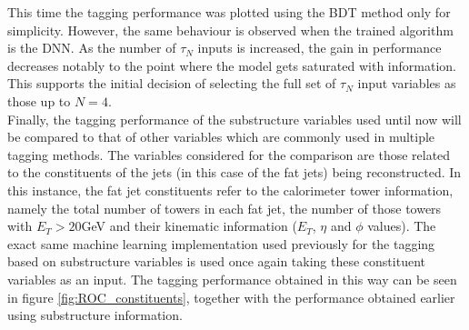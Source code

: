\documentclass[main]{subfiles} %
\begin{document}
This time the tagging performance was plotted using the BDT method only for simplicity. However, the same behaviour is observed when the trained algorithm is the DNN. As the number of $\tau_N$ inputs is increased, the gain in performance decreases notably to the point where the model gets saturated with information. This supports the initial decision of selecting the full set of $\tau_N$ input variables as those up to $N = 4$. \\

Finally, the tagging performance of the substructure variables used until now will be compared to that of other variables which are commonly used in multiple tagging methods. The variables considered for the comparison are those related to the constituents of the jets (in this case of the fat jets) being reconstructed. In this instance, the fat jet constituents refer to the calorimeter tower information, namely the total number of towers in each fat jet, the number of those towers with $E_T > 20$\;GeV and their kinematic information ($E_T$, $\eta$ and $\phi$ values). The exact same machine learning implementation used previously for the tagging based on substructure variables is used once again taking these constituent variables as an input. The tagging performance obtained in this way can be seen in figure \ref{fig:ROC_constituents}, together with the performance obtained earlier using substructure information.\\  
\end{document}
